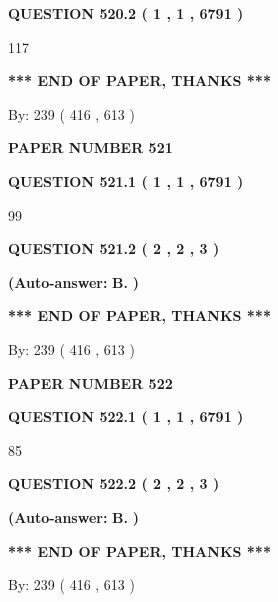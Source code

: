 \documentclass[12pt]{article}
\begin{document}
  
{\textbf{\large{QUESTION
520.2 
 ( 1 , 1 , 6791 )
}}}

117
   
   
   
   
\vspace{1.0in} 
{\textbf{\large{ *** END OF PAPER, THANKS *** }}} 
   
   
\hspace{1.0in} By: 
 239 ( 416 ,  613 )
   
   
   
   
\newpage 
\setcounter{page}{ 
   521001 } 
   
   
 {\textbf{ \Large{ PAPER NUMBER  521  }}}
   
   
   
   
  
  
{\textbf{\large{QUESTION
521.1 
 ( 1 , 1 , 6791 )
}}}

99
  
  
{\textbf{\large{QUESTION
521.2 
 ( 2 , 2 , 3 )
}}}
 
 
{\textbf{(Auto-answer:}}
{\textbf{\large{
B.}}}
{\textbf{)}}
 
 
   
   
   
   
\vspace{1.0in} 
{\textbf{\large{ *** END OF PAPER, THANKS *** }}} 
   
   
\hspace{1.0in} By: 
 239 ( 416 ,  613 )
   
   
   
   
\newpage 
\setcounter{page}{ 
   522001 } 
   
   
 {\textbf{ \Large{ PAPER NUMBER  522  }}}
   
   
   
   
  
  
{\textbf{\large{QUESTION
522.1 
 ( 1 , 1 , 6791 )
}}}

85
  
  
{\textbf{\large{QUESTION
522.2 
 ( 2 , 2 , 3 )
}}}
 
 
{\textbf{(Auto-answer:}}
{\textbf{\large{
B.}}}
{\textbf{)}}
 
 
   
   
   
   
\vspace{1.0in} 
{\textbf{\large{ *** END OF PAPER, THANKS *** }}} 
   
   
\hspace{1.0in} By: 
 239 ( 416 ,  613 )
   
   
   
\end{document}
